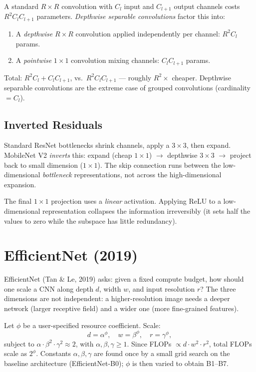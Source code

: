 \documentclass[11pt, oneside]{book}
\begin{document}
A standard $R\times R$ convolution with $C_l$ input and $C_{l+1}$ output channels
costs $R^2 C_l C_{l+1}$ parameters.
\emph{Depthwise separable convolutions} factor this into:
\begin{enumerate}
  \item A \emph{depthwise} $R\times R$ convolution applied independently per channel: $R^2 C_l$ params.
  \item A \emph{pointwise} $1\times1$ convolution mixing channels: $C_l C_{l+1}$ params.
\end{enumerate}
Total: $R^2 C_l + C_l C_{l+1}$, vs.\ $R^2 C_l C_{l+1}$ — roughly $R^2 \times$ cheaper.
Depthwise separable convolutions are the extreme case of grouped convolutions
(cardinality $= C_l$).

\subsection{Inverted Residuals}

Standard ResNet bottlenecks shrink channels, apply a $3\times3$, then expand.
MobileNet V2 \emph{inverts} this: expand (cheap $1\times1$) $\to$ depthwise $3\times3$
$\to$ project back to small dimension ($1\times1$).
The skip connection runs between the low-dimensional \emph{bottleneck} representations,
not across the high-dimensional expansion.

\begin{notebox}[title={No ReLU after Bottleneck Projection}]
The final $1\times1$ projection uses a \emph{linear} activation.
Applying ReLU to a low-dimensional representation collapses the information irreversibly
(it sets half the values to zero while the subspace has little redundancy).
\end{notebox}

\section{EfficientNet (2019)}

EfficientNet (Tan \& Le, 2019) asks: given a fixed compute budget, how should one
scale a CNN along depth $d$, width $w$, and input resolution $r$?
The three dimensions are not independent: a higher-resolution image needs a deeper
network (larger receptive field) and a wider one (more fine-grained features).

\begin{thmbox}[title={Compound Scaling}]
Let $\phi$ be a user-specified resource coefficient. Scale:
\[
  d = \alpha^\phi,\quad w = \beta^\phi,\quad r = \gamma^\phi,
\]
subject to $\alpha \cdot \beta^2 \cdot \gamma^2 \approx 2$, with $\alpha,\beta,\gamma \geq 1$.
Since FLOPs $\propto d \cdot w^2 \cdot r^2$, total FLOPs scale as $2^\phi$.
Constants $\alpha, \beta, \gamma$ are found once by a small grid search on the
baseline architecture (EfficientNet-B0); $\phi$ is then varied to obtain B1–B7.
\end{thmbox}
\end{document}
